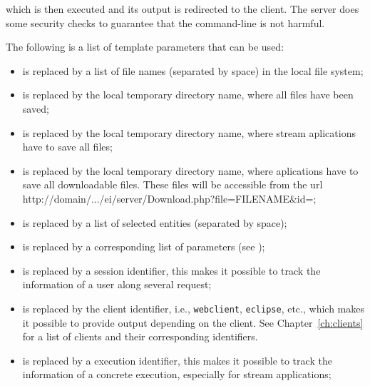 {  \bigskip 
  \noindent
  which is then executed and its output is redirected to the
  client. The server does some security checks to guarantee that the
  command-line is not harmful. %

  \bigskip 
  \noindent
  The following is a list of template parameters that can be used:

  \begin{itemize}
  \item {} is replaced by a list of file
    names (separated by space) in the local file system;

  \item {} is replaced by the local
    temporary directory name, where all files have been saved;

  \item {} is replaced by the local
    temporary directory name, where stream aplications have to save
    all files; 

  \item {} is replaced by the local
    temporary directory name, where aplications have to save
    all downloadable files. These files will be accessible from the
    url
    \\http://domain/.../ei/server/Download.php?file=FILENAME\&id=; 
  \item {} is replaced by a list of
    selected entities (separated by space);
  \item {} is replaced by a
    corresponding list of parameters (see );
  \item {} is replaced by a session
    identifier, this makes it possible to track the information of a
    user along several request;
  \item {} is replaced by the client
    identifier, i.e., \texttt{webclient}, \texttt{eclipse}, etc.,
    which makes it possible to provide output depending on the
    client. See Chapter~\ref{ch:clients} for a list of clients and
    their corresponding identifiers.
%
  \item {} is replaced by a execution
    identifier, this makes it possible to track the information of a
    concrete execution, especially for stream applications;
  \end{itemize}
%
}



